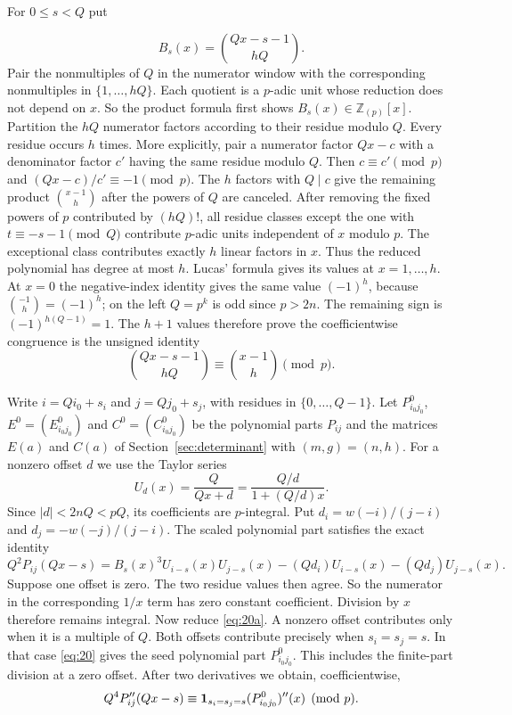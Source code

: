 For $0\le s<Q$ put

\begin{equation}
 B_s(x)=\binom{Qx-s-1}{hQ}.
\end{equation}
Pair the nonmultiples of $Q$ in the numerator window with the corresponding
nonmultiples in $\{1,\ldots,hQ\}$. Each quotient is a $p$-adic unit whose
reduction does not depend on $x$. So the product formula first shows $B_s(x)\in\mathbb Z_{(p)}[x]$.
Partition the $hQ$ numerator factors
according to their residue modulo $Q$. Every residue occurs $h$ times.
More explicitly, pair a numerator factor $Qx-c$ with a denominator factor
$c'$ having the same residue modulo $Q$. Then $c\equiv c'\pmod p$ and
$(Qx-c)/c'\equiv-1\pmod p$. The $h$ factors with $Q\mid c$ give the
remaining product $\binom{x-1}{h}$ after the powers of $Q$ are canceled.
After removing the fixed powers of $p$ contributed by $(hQ)!$, all residue
classes except the one with $t\equiv-s-1\pmod Q$ contribute $p$-adic units
independent of $x$ modulo $p$. The exceptional class contributes exactly
$h$ linear factors in $x$. Thus the reduced polynomial has degree at most
$h$. Lucas' formula gives its values at $x=1,\ldots,h$. At $x=0$ the
negative-index identity gives the same value $(-1)^h$, because
$\binom{-1}{h}=(-1)^h$; on the left $Q=p^k$ is odd since $p>2n$.
The remaining sign is $(-1)^{h(Q-1)}=1$. The $h+1$ values therefore prove the coefficientwise congruence
is the unsigned identity
\begin{equation}
 \binom{Qx-s-1}{hQ}\equiv\binom{x-1}{h}\pmod p.       \label{eq:20}
\end{equation}

Write $i=Qi_0+s_i$ and $j=Qj_0+s_j$, with residues in
$\{0,\ldots,Q-1\}$. Let $P^0_{i_0j_0}$, $E^0=(E^0_{i_0j_0})$ and
$C^0=(C^0_{i_0j_0})$ be the polynomial parts $P_{ij}$ and the matrices
$E(a)$ and $C(a)$ of Section~\ref{sec:determinant} with $(m,g)=(n,h)$.
For a nonzero offset $d$ we use the Taylor series
\[
 U_d(x)=\frac{Q}{Qx+d}=\frac{Q/d}{1+(Q/d)x}.
\]
Since $|d|<2nQ<pQ$, its coefficients are $p$-integral. Put
$d_i=w(-i)/(j-i)$ and $d_j=-w(-j)/(j-i)$. The scaled polynomial part
satisfies the exact identity
\begin{equation}
 Q^2P_{ij}(Qx-s)=B_s(x)^3U_{i-s}(x)U_{j-s}(x)
 -(Qd_i)U_{i-s}(x)-(Qd_j)U_{j-s}(x).                  \label{eq:20a}
\end{equation}
Suppose one offset is zero. The two residue values then agree. So the
numerator in the corresponding $1/x$ term has zero constant coefficient.
Division by $x$ therefore remains integral. Now reduce \eqref{eq:20a}. A nonzero
offset contributes only when it is a multiple of $Q$. Both offsets
contribute precisely when $s_i=s_j=s$. In that case \eqref{eq:20} gives the seed
polynomial part $P^0_{i_0j_0}$. This includes the finite-part division at a
zero offset. After two derivatives we obtain, coefficientwise,
\begin{equation}
 Q^4P_{ij}''(Qx-s)\equiv
 {\bf1}_{s_i=s_j=s}(P^0_{i_0j_0})''(x)\pmod p.             \label{eq:21}
\end{equation}

